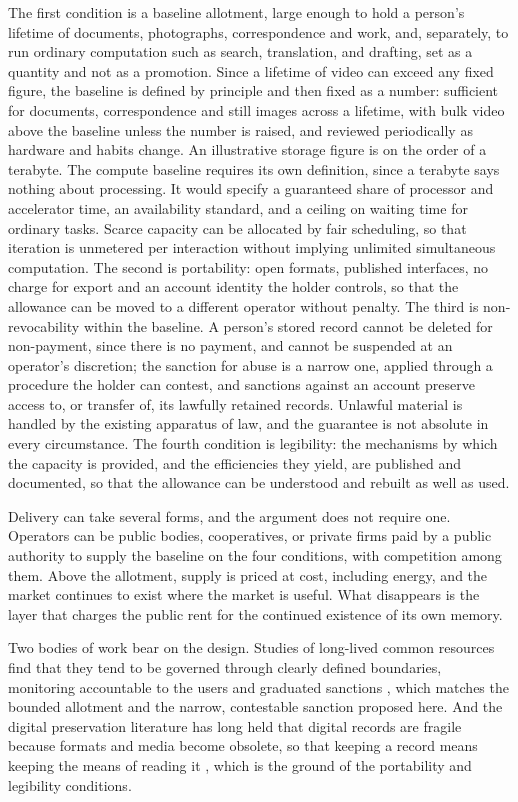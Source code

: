 \documentclass[12pt]{article}
\begin{document}
The first condition is a baseline allotment, large enough to hold a person's lifetime of documents, photographs, correspondence and work, and, separately, to run ordinary computation such as search, translation, and drafting, set as a quantity and not as a promotion. Since a lifetime of video can exceed any fixed figure, the baseline is defined by principle and then fixed as a number: sufficient for documents, correspondence and still images across a lifetime, with bulk video above the baseline unless the number is raised, and reviewed periodically as hardware and habits change. An illustrative storage figure is on the order of a terabyte. The compute baseline requires its own definition, since a terabyte says nothing about processing. It would specify a guaranteed share of processor and accelerator time, an availability standard, and a ceiling on waiting time for ordinary tasks. Scarce capacity can be allocated by fair scheduling, so that iteration is unmetered per interaction without implying unlimited simultaneous computation. The second is portability: open formats, published interfaces, no charge for export and an account identity the holder controls, so that the allowance can be moved to a different operator without penalty. The third is non-revocability within the baseline. A person's stored record cannot be deleted for non-payment, since there is no payment, and cannot be suspended at an operator's discretion; the sanction for abuse is a narrow one, applied through a procedure the holder can contest, and sanctions against an account preserve access to, or transfer of, its lawfully retained records. Unlawful material is handled by the existing apparatus of law, and the guarantee is not absolute in every circumstance. The fourth condition is legibility: the mechanisms by which the capacity is provided, and the efficiencies they yield, are published and documented, so that the allowance can be understood and rebuilt as well as used.

Delivery can take several forms, and the argument does not require one. Operators can be public bodies, cooperatives, or private firms paid by a public authority to supply the baseline on the four conditions, with competition among them. Above the allotment, supply is priced at cost, including energy, and the market continues to exist where the market is useful. What disappears is the layer that charges the public rent for the continued existence of its own memory.

Two bodies of work bear on the design. Studies of long-lived common resources find that they tend to be governed through clearly defined boundaries, monitoring accountable to the users and graduated sanctions \cite{ostrom}, which matches the bounded allotment and the narrow, contestable sanction proposed here. And the digital preservation literature has long held that digital records are fragile because formats and media become obsolete, so that keeping a record means keeping the means of reading it \cite{rothenberg}, which is the ground of the portability and legibility conditions.
\end{document}
